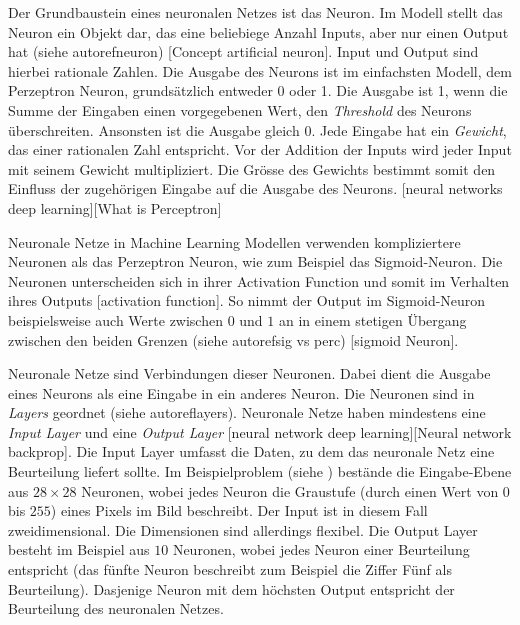 Der Grundbaustein eines neuronalen Netzes ist das Neuron. Im Modell stellt das
Neuron ein Objekt dar, das eine beliebiege Anzahl Inputs, aber nur einen Output
hat (siehe autoref{neuron}) [Concept artificial neuron]. Input und Output sind
hierbei rationale Zahlen. Die Ausgabe des Neurons ist im einfachsten Modell, dem
Perzeptron Neuron, grundsätzlich entweder 0 oder 1. Die Ausgabe ist 1, wenn die Summe
der Eingaben einen vorgegebenen Wert, den \emph{Threshold} des Neurons überschreiten.
Ansonsten ist die Ausgabe gleich 0. Jede Eingabe hat ein \emph{Gewicht}, das
einer rationalen Zahl entspricht. Vor der Addition der Inputs wird jeder Input
mit seinem Gewicht multipliziert.  Die Grösse des Gewichts bestimmt somit den
Einfluss der zugehörigen Eingabe auf die Ausgabe des Neurons. [neural networks
deep learning][What is Perceptron]


Neuronale Netze in Machine Learning Modellen verwenden kompliziertere Neuronen
als das Perzeptron Neuron, wie zum Beispiel das Sigmoid-Neuron. Die Neuronen
unterscheiden sich in ihrer Activation Function und somit im Verhalten ihres
Outputs [activation function]. So nimmt der Output im Sigmoid-Neuron
beispielsweise auch Werte zwischen $0$ und $1$ an in einem stetigen Übergang
zwischen den beiden Grenzen (siehe autoref{sig vs perc}) [sigmoid Neuron].


Neuronale Netze sind Verbindungen dieser Neuronen. Dabei dient die Ausgabe eines
Neurons als eine Eingabe in ein anderes Neuron. Die Neuronen sind in
\emph{Layers} geordnet (siehe autoref{layers}). Neuronale Netze haben mindestens
eine \emph{Input Layer} und eine \emph{Output Layer} [neural network deep
learning][Neural network backprop]. Die Input Layer umfasst die Daten, zu dem das
neuronale Netz eine Beurteilung liefert sollte. Im Beispielproblem (siehe
) bestände die Eingabe-Ebene aus $28\times28$ Neuronen, wobei
jedes Neuron die Graustufe (durch einen Wert von $0$ bis $255$) eines Pixels im
Bild beschreibt. Der Input ist in diesem Fall zweidimensional. Die Dimensionen
sind allerdings flexibel. Die Output Layer besteht im Beispiel aus $10$
Neuronen, wobei jedes Neuron einer Beurteilung entspricht (das fünfte Neuron
beschreibt zum Beispiel die Ziffer Fünf als Beurteilung). Dasjenige Neuron mit
dem höchsten Output entspricht der Beurteilung des neuronalen Netzes.


